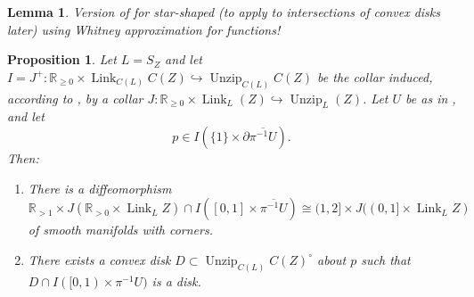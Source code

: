 \documentclass[11pt]{amsart}
\newcommand{\mbb}[1]{\mathbb{#1}}
\newcommand{\R}{\mbb{R}}
\DeclareMathOperator{\Unzip}{Unzip}
\DeclareMathOperator{\Link}{Link}
\numberwithin{equation}{section}
\theoremstyle{definition}
\theoremstyle{remark}
\theoremstyle{plain}
\newtheorem{proposition}[equation]{Proposition}
\newtheorem{lemma}[equation]{Lemma}
\begin{document}
\begin{lemma}
    Version of  for star-shaped (to apply to intersections of convex disks later) using Whitney approximation for functions!
\end{lemma}


\begin{proposition}\label{DEA068T}
    Let $L=S_Z$ and let $I=J^+\colon \R_{\geq0}\times\Link_{C(L)}C(Z)\hookrightarrow\Unzip_{C(L)}C(Z)$ be the collar induced, according to , by a collar $J\colon\R_{\geq0}\times\Link_L(Z)\hookrightarrow \Unzip_L(Z)$. Let $U$ be as in , and let 
    \[
        p\in I(\{1\}\times\partial\overline{\pi^{-1}U}).
    \]
    Then:
    \begin{enumerate} 
        \item There is a diffeomorphism 
        \[
            \R_{>1}\times J(\R_{>0}\times\Link_LZ)\cap I([0,1]\times\overline{\pi^{-1}U})\cong (1,2]\times J((0,1]\times\Link_LZ)
        \]
        of smooth manifolds with corners.
        \item There exists a convex disk $D\subset\Unzip_{C(L)}C(Z)^\circ$ about $p$ such that $D\cap I([0,1)\times\pi^{-1}U)$ is a disk. 
    \end{enumerate}
\end{proposition}
\end{document}
